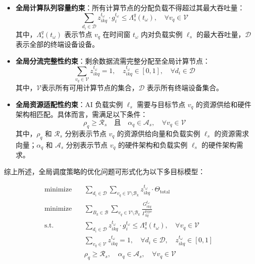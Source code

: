 \begin{itemize}
    \item \textbf{全局计算队列容量约束}：所有计算节点的分配负载不得超过其最大吞吐量：
    \[
    \sum_{d_i \in \mathcal{D}} z_{ikq}^{t_\omega} \cdot g_i^{t_\omega} \leq \Lambda_s^q(t_\omega), \quad \forall v_q \in \mathcal{V}
    \]
    其中，$\Lambda_s^{q}(t_\omega)$ 表示节点 $v_{q}$ 在时间窗 $t_\omega$ 内对负载实例 $\ell_s$ 的最大吞吐量，$\mathcal{D}$表示全部的终端设备设备。

    \item \textbf{全局分流完整性约束}：剩余数据流需完整分配至全局计算节点：
    \[
    \sum_{v_q \in \mathcal{V}} z_{ikq}^{t_\omega} = 1, \quad z_{ikq}^{t_\omega} \in [0,1], \quad \forall d_i \in \mathcal{D}
    \]
    其中，$\mathcal{V}$表示所有可用计算节点的集合，$\mathcal{D}$ 表示所有终端设备集合。

    \item \textbf{全局资源适配性约束}：AI 负载实例 $\ell_s$ 需要与目标节点 $v_q$ 的资源供给和硬件架构相匹配。具体而言，需满足以下条件：
    \[
    \rho_q \geq \mathcal{R}_s \quad \text{且} \quad \alpha_q \in \mathcal{A}_s, \quad \forall v_q \in \mathcal{V}
    \]
    其中，$\rho_{q}$ 和 $\mathcal{R}_s$ 分别表示节点 $v_q$ 的资源供给向量和负载实例 $\ell_s$ 的资源需求向量；$\alpha_q$ 和 $\mathcal{A}_s$ 分别表示节点 $v_q$ 的硬件架构和负载实例 $\ell_s$ 的硬件架构需求。


\end{itemize}

综上所述，全局调度策略的优化问题可形式化为以下多目标模型：

\[
\begin{aligned}
\mathop{\text{minimize}}\quad & \sum_{d_i \in \mathcal{D}} \sum_{v_q \in \mathcal{V} \setminus \mathcal{B}_k} z_{ikq}^{t_\omega} \cdot \Theta_{\text{total}} \\
\mathop{\text{minimize}}\quad & \sum_{B_k \in \mathcal{B}} \sum_{v_q \in \mathcal{V} \setminus \mathcal{B}_k} \frac{G_{ikq}^{t_\omega}}{\Gamma_{kq}^{\text{type}}} \\
\text{s.t.}\quad 
& \sum_{d_i \in \mathcal{D}} z_{ikq}^{t_\omega} \cdot g_i^{t_\omega} \leq \Lambda_s^q(t_\omega), \quad \forall v_q \in \mathcal{V} \\
& \sum_{v_q \in \mathcal{V} } z_{ikq}^{t_\omega} = 1, \quad \forall d_i \in \mathcal{D}, \quad z_{ikq}^{t_\omega} \in [0,1] \\
& \rho_q \geq \mathcal{R}_s, \quad \alpha_q \in \mathcal{A}_s, \quad \forall v_q \in \mathcal{V} 
\end{aligned}
\label{eq:global_scheduling}
\]

